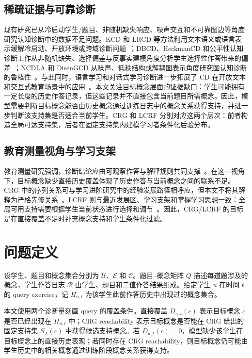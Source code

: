 \documentclass[conference]{IEEEtran}
\begin{document}
\subsection{稀疏证据与可靠诊断}
现有研究已从冷启动学生/题目、非随机缺失响应、噪声交互和不可靠图边等角度研究认知诊断中的数据不足问题。KCD 和 LRCD 等方法利用文本语义或语言表示缓解冷启动、开放环境或跨域诊断问题~\cite{dong2025kcd,liu2025lrcd}；DBCD、HeckmanCD 和公平性认知诊断工作从非随机缺失、选择偏差与反事实建模角度分析学生选择性作答带来的偏差~\cite{yang2026dbcd,han2024heckmancd,zhang2024faircd,zhang2024causalcdf}；NCDLA 和 DisenGCD 从噪声、低秩结构或解耦图表示角度研究图认知诊断的鲁棒性~\cite{zhang2026ncdla,yang2024disengcd}。与此同时，语言学习和对话式学习诊断进一步拓展了 CD 在开放文本和交互式教育场景中的应用~\cite{ma2024languagecd,yao2026parld}。本文关注目标概念层面的证据缺口：学生可能拥有一定长度的历史作答记录，但这些记录并不直接包含当前题目所需概念。因此，模型需要判断目标概念能否由历史概念通过训练日志中的概念关系获得支持，并进一步判断该支持集是否适合当前学生。CRG 和 LCRF 分别对应这两个层次：前者构造全局可达支持集，后者在固定支持集内建模学习者条件化后验分布。

\subsection{教育测量视角与学习支架}
教育测量研究强调，诊断结论应由可观察作答与解释规则共同支撑~\cite{pellegrino2001knowing,mislevy2003structure}。在这一视角下，目标概念缺少直接历史覆盖体现了历史作答与当前概念之间的联系不足。CRG 中的序列关系可与学习进阶研究中的经验发展路径相呼应，但本文不将其解释为严格先修关系~\cite{corcoran2009learning}。LCRF 则与最近发展区、学习支架和掌握学习思想一致：全局可用支持需要根据学生当前状态进行选择和调节~\cite{vygotsky1978mind,wood1976tutoring,bloom1968learning}。因此，CRG/LCRF 的目标是在直接覆盖不足时补充概念支持和学生条件化过滤。

\section{问题定义}
设学生、题目和概念集合分别为 \(\mathcal{U}\)、\(\mathcal{E}\) 和 \(\mathcal{C}\)。题目--概念矩阵 \(Q\) 描述每道题涉及的概念，学生作答日志 \(\mathcal{R}\) 由学生、题目和二值作答结果组成。给定学生 \(u\) 在时间 \(t\) 的 query exercise，记 \(H_{u,t}\) 为该学生此前作答历史中出现过的概念集合。

本文使用两个诊断量刻画 query 的覆盖条件。直接覆盖 \(D_{u,t}(c)\) 表示目标概念 \(c\) 是否已经出现在 \(H_{u,t}\) 中；CRG reachability 表示目标概念是否能在 CRG 给出的固定支持集 \(S_A(c)\) 中获得候选支持概念。若 \(D_{u,t}(c)=0\)，模型缺少该学生在目标概念上的直接历史表现；若同时存在 CRG reachability，则目标概念仍可能由学生历史中的相关概念通过训练阶段概念关系获得支持。
\end{document}
